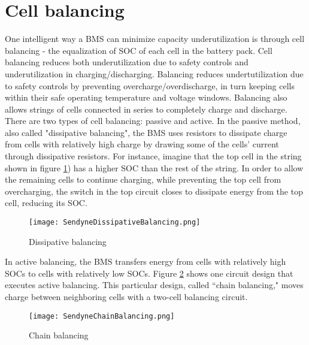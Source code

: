 	\section{Cell balancing}
One intelligent way a BMS can minimize capacity underutilization is through cell balancing - the equalization of SOC of each cell in the battery pack. Cell balancing reduces both underutilization due to safety controls and underutilization in charging/discharging. Balancing reduces undertutilization due to safety controls by preventing overcharge/overdischarge, in turn keeping cells within their safe operating temperature and voltage windows. %
Balancing also allows strings of cells connected in series to completely charge and discharge. %
There are two types of cell balancing: passive and active. In the passive method, also called "dissipative balancing", the BMS uses resistors to dissipate charge from cells with relatively high charge by drawing some of the cells' current through dissipative resistors. For instance, imagine that the top cell in the string shown in figure \ref{fig:Dissipative}) has a higher SOC than the rest of the string. In order to allow the remaining cells to continue charging, while preventing the top cell from overcharging, the switch in the top circuit closes to dissipate energy from the top cell, reducing its SOC.
\begin{figure}[H]
\centering
\texttt{[image: SendyneDissipativeBalancing.png]}
\caption{Dissipative balancing
\label{fig:Dissipative}
\cite[p.~2]{SendyneChargeControllerPatent}}
\end{figure}

In active balancing, the BMS transfers energy from cells with relatively high SOCs to cells with relatively low SOCs. Figure \ref{fig:ChainBalancing} shows one circuit design that executes active balancing. This particular design, called ``chain balancing," moves charge between neighboring cells with a two-cell balancing circuit.
\begin{figure}[H]
\centering
\texttt{[image: SendyneChainBalancing.png]}
\caption{Chain balancing
\label{fig:ChainBalancing}
\cite[p.~2]{SendyneChargeControllerPatent}}
\end{figure}

